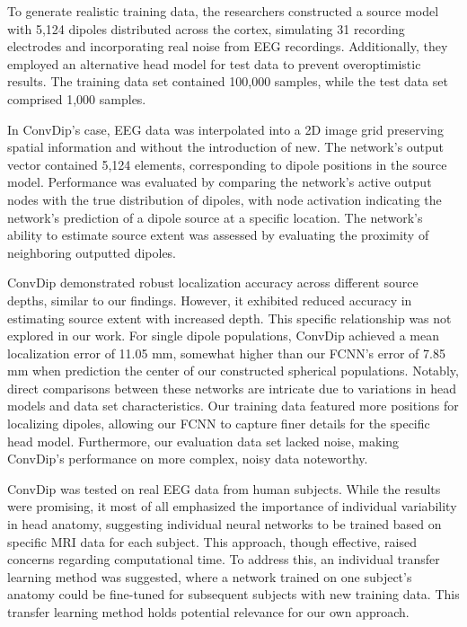 \documentclass[a4paper, UKenglish, 11pt]{uiomaster}
\begin{document}
To generate realistic training data, the researchers constructed a source model with 5,124 dipoles distributed across the cortex, simulating 31 recording electrodes and incorporating real noise from EEG recordings. Additionally, they employed an alternative head model for test data to prevent overoptimistic results. The training data set contained 100,000 samples, while the test data set comprised 1,000 samples.

In ConvDip's case, EEG data was interpolated into a 2D image grid preserving spatial information and without the introduction of new. The network's output vector contained 5,124 elements, corresponding to dipole positions in the source model. Performance was evaluated by comparing the network's active output nodes with the true distribution of dipoles, with node activation indicating the network's prediction of a dipole source at a specific location. The network's ability to estimate source extent was assessed by evaluating the proximity of neighboring outputted dipoles.

ConvDip demonstrated robust localization accuracy across different source depths, similar to our findings. However, it exhibited reduced accuracy in estimating source extent with increased depth. This specific relationship was not explored in our work. For single dipole populations, ConvDip achieved a mean localization error of 11.05 mm, somewhat higher than our FCNN's error of 7.85 mm when prediction the center of our constructed spherical populations. Notably, direct comparisons between these networks are intricate due to variations in head models and data set characteristics. Our training data featured more positions for localizing dipoles, allowing our FCNN to capture finer details for the specific head model. Furthermore, our evaluation data set lacked noise, making ConvDip's performance on more complex, noisy data noteworthy.

ConvDip was tested on real EEG data from human subjects. While the results were promising, it most of all emphasized the importance of individual variability in head anatomy, suggesting individual neural networks to be trained based on specific MRI data for each subject. This approach, though effective, raised concerns regarding computational time. To address this, an individual transfer learning method was suggested, where a network trained on one subject's anatomy could be fine-tuned for subsequent subjects with new training data. This transfer learning method holds potential relevance for our own approach.
\end{document}
